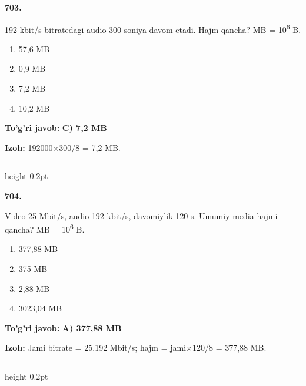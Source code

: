 \documentclass[10pt,a4paper,oneside]{article}
\begin{document}
\noindent\textbf{\color{ink}703.}
\par
192 kbit/s bitratedagi audio 300 soniya davom etadi. Hajm qancha? MB = 10\textsuperscript{6} B.
\begin{enumerate}[label=\Alph*),leftmargin=9mm]
\item 57,6 MB
\item 0,9 MB
\item 7,2 MB
\item 10,2 MB
\end{enumerate}
\begin{tcolorbox}[enhanced,breakable,colback=teal!4,colframe=teal!50!black,boxrule=0.5pt,arc=1.1mm,left=3mm,right=3mm,top=1.7mm,bottom=1.7mm,before skip=2mm,after skip=2mm]
\textbf{\color{teal}To'g'ri javob:} \textbf{C) 7,2 MB}
\par\smallskip
\textbf{Izoh:} 192000\ensuremath{\times}300/8 = 7,2 MB.
\end{tcolorbox}
\vspace{2mm}\hrule height 0.2pt \vspace{3mm}

\noindent\textbf{\color{ink}704.}
\par
Video 25 Mbit/s, audio 192 kbit/s, davomiylik 120 s. Umumiy media hajmi qancha? MB = 10\textsuperscript{6} B.
\begin{enumerate}[label=\Alph*),leftmargin=9mm]
\item 377,88 MB
\item 375 MB
\item 2,88 MB
\item 3023,04 MB
\end{enumerate}
\begin{tcolorbox}[enhanced,breakable,colback=teal!4,colframe=teal!50!black,boxrule=0.5pt,arc=1.1mm,left=3mm,right=3mm,top=1.7mm,bottom=1.7mm,before skip=2mm,after skip=2mm]
\textbf{\color{teal}To'g'ri javob:} \textbf{A) 377,88 MB}
\par\smallskip
\textbf{Izoh:} Jami bitrate = 25.192 Mbit/s; hajm = jami\ensuremath{\times}120/8 = 377,88 MB.
\end{tcolorbox}
\vspace{2mm}\hrule height 0.2pt \vspace{3mm}
\end{document}
